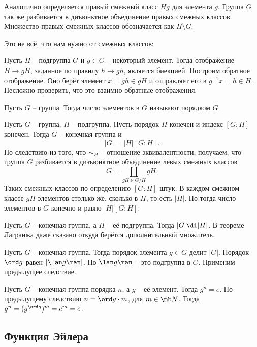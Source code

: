\rm Аналогично определяется правый смежный класс $Hg$ для элемента $g$. Группа $G$ так же разбивается в диъюнктное объединение правых смежных классов. Множество правых смежных классов обозначается как $H\setminus G$.
\erm 

Это не всё, что нам нужно от смежных классов:

\utv Пусть $H$ -- подгруппа $G$ и $g\in G$ -- некоторый элемент. Тогда отображение $H \to gH$, заданное по правилу $h \to gh$, является биекцией.
\eutv
\proof Построим обратное отображение. Оно берёт элемент $x=gh\in gH$ и отправляет его в $g^{-1}x=h \in H $. Несложно проверить, что это взаимно обратные отображения.
\endproof

\dfn Пусть $G$ -- группа. Тогда число элементов в $G$ называют порядком $G$.
\edfn

\thrm[Лагранжа]  Пусть $G$ -- группа, $H$ -- подгруппа. Пусть порядок  $H$ конечен и индекс $[G:H]$ конечен. Тогда $G$ -- конечная группа и 
 $$|G|=|H|[G:H].$$
\ethrm
\proof По следствию из того, что $\sim_H$ -- отношение эквивалентности, получаем, что группа $G$ разбивается в дизъюнктное объединение левых смежных классов $$G=\coprod_{gH \in G/H} gH.$$
Таких смежных классов по определению $[G:H]$ штук. В каждом смежном классе $gH$ элементов столько же, сколько в $H$, то есть $|H|$. Но тогда число элементов в $G$ конечно и равно $|H|[G:H]$.
\endproof

\crl Пусть $G$ -- конечная группа, а $H$ -- её подгруппа. Тогда $|G| \di |H|$.
\ecrl
\proof В теореме Лагранжа даже сказано откуда берётся дополнительный множитель.
\endproof

\edfn

\edfn

\elm

\crl Пусть $G$ -- конечная группа. Тогда порядок элемента $g\in G$ делит $|G|$.
\ecrl
\proof Порядок $\ord g$ равен $|\lan g\ran|$. Но $\lan g\ran$ -- это подгруппа в $G$. Применим предыдущее следствие.
\endproof

\crl Пусть $G$ -- конечная группа порядка $n$, а $g$ -- её элемент. Тогда $g^n=e$.
\ecrl  
\proof По предыдущему следствию $n= \ord g \cdot m$, для $m\in \mb N$. Тогда $g^n=(g^{\ord g})^m=e^m=e$. 
\endproof

\subsection{Функция Эйлера}

